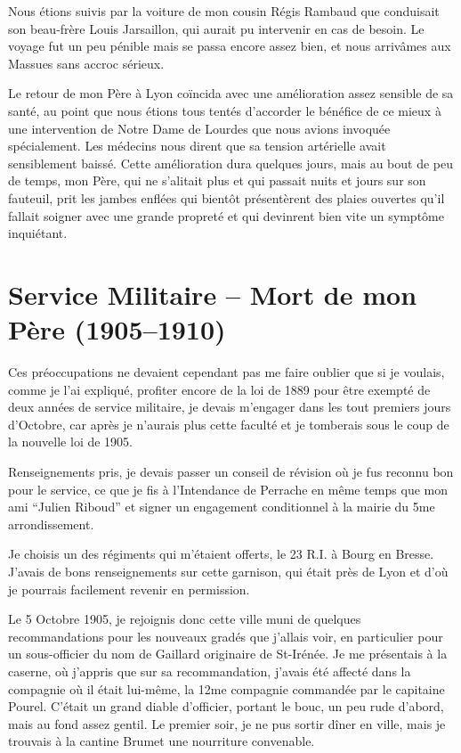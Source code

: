 \documentclass[11pt,a4paper]{report}
\begin{document}
Nous étions suivis par la voiture de mon cousin Régis Rambaud que conduisait son beau-frère Louis Jarsaillon, qui aurait pu intervenir en cas de besoin. Le voyage fut un peu pénible mais se passa encore assez bien, et nous arrivâmes aux Massues sans accroc sérieux.

Le retour de mon Père à Lyon coïncida avec une amélioration assez sensible de sa santé, au point que nous étions tous tentés d'accorder le bénéfice de ce mieux à une intervention de Notre Dame de Lourdes que nous avions invoquée spécialement. Les médecins nous dirent que sa tension artérielle avait sensiblement baissé. Cette amélioration dura quelques jours, mais au bout de peu de temps, mon Père, qui ne s'alitait plus et qui passait nuits et jours sur son fauteuil, prit les jambes enflées qui bientôt présentèrent des plaies ouvertes qu'il fallait soigner avec une grande propreté et qui devinrent bien vite un symptôme inquiétant.

\chapter{Service Militaire -- Mort de mon Père (1905--1910)}

Ces préoccupations ne devaient cependant pas me faire oublier que si je voulais, comme je l'ai expliqué, profiter encore de la loi de 1889 pour être exempté de deux années de service militaire, je devais m'engager dans les tout premiers jours d'Octobre, car après je n'aurais plus cette faculté et je tomberais sous le coup de la nouvelle loi de 1905.

Renseignements pris, je devais passer un conseil de révision où je fus reconnu bon pour le service, ce que je fis à l'Intendance de Perrache en même temps que mon ami ``Julien Riboud'' et signer un engagement conditionnel à la mairie du 5me arrondissement.

Je choisis un des régiments qui m'étaient offerts, le 23 R.I. à Bourg en Bresse. J'avais de bons renseignements sur cette garnison, qui était près de Lyon et d'où je pourrais facilement revenir en permission.

Le 5 Octobre 1905, je rejoignis donc cette ville muni de quelques recommandations pour les nouveaux gradés que j'allais voir, en particulier pour un sous-officier du nom de Gaillard originaire de St-Irénée. Je me présentais à la caserne, où j'appris que sur sa recommandation, j'avais été affecté dans la compagnie où il était lui-même, la 12me compagnie commandée par le capitaine Pourel. C'était un grand diable d'officier, portant le bouc, un peu rude d'abord, mais au fond assez gentil. Le premier soir, je ne pus sortir dîner en ville, mais je trouvais à la cantine Brumet une nourriture convenable.
\end{document}
